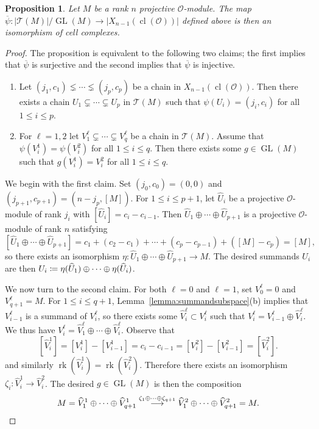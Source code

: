 \documentclass[11 pt]{article}
\theoremstyle{plain}
\newtheorem{proposition}[theorem]{Proposition}
\theoremstyle{definition}
\numberwithin{equation}{section}
\DeclareMathOperator{\GL}{GL}
\renewcommand{\O}{\mathcal{O}}
\DeclareMathOperator{\class}{cl}
\newcommand\Tits{\ensuremath{\mathcal{T}}}
\newcommand\coloneq{\mathrel{\mathop:}\mkern-1.2mu=}
\newcommand\abs[1]{\left\lvert#1\right\rvert}
\DeclareMathOperator{\Rank}{rk}
\begin{document}
\begin{proposition}
\label{proposition:quotientdesc}
Let $M$ be a rank $n$ projective $\O$-module.
The map $\overline{\psi}\colon \abs{\Tits(M)} / \GL(M) \rightarrow \abs{X_{n-1}(\class(\O))}$ defined
above is then an isomorphism of cell complexes.
\end{proposition}
\begin{proof}
The proposition is equivalent to the following two claims; the first implies that $\overline{\psi}$ is surjective
and the second implies that $\overline{\psi}$ is injective.
\begin{enumerate}[nosep]
\item Let $(j_1,c_1) \lneq \cdots \lneq (j_p,c_{p})$ be a chain in $X_{n-1}(\class(\O))$.  Then
there exists a chain $U_1 \subsetneq \cdots \subsetneq U_p$ in $\Tits(M)$ such that
$\psi(U_i) = (j_i,c_i)$ for all $1 \leq i \leq p$.
\item For $\ell=1,2$ let $V_1^{\ell} \subsetneq \cdots \subsetneq V_q^{\ell}$ be a chain in $\Tits(M)$.  Assume
that $\psi(V_i^{1}) = \psi(V_i^2)$ for all $1 \leq i \leq q$.  Then there exists some $g \in \GL(M)$
such that $g(V_i^1) = V_i^2$ for all $1 \leq i \leq q$.
\end{enumerate}
We begin with the first claim.  Set 
$(j_0,c_0) = (0,0)$ and $(j_{p+1},c_{p+1}) = (n-j_p,[M])$.
For $1 \leq i \leq p+1$, let $\widehat{U}_i$ be a projective $\O$-module
of rank $j_i$ with $[\widehat{U}_i] = c_i - c_{i-1}$.
Then $\widehat{U}_1 \oplus \cdots \oplus \widehat{U}_{p+1}$ is a projective $\O$-module of rank $n$ satisfying
\[[\widehat{U}_1 \oplus \cdots \oplus \widehat{U}_{p+1}] = c_1 + (c_2 - c_1) + \cdots + (c_p - c_{p-1}) + ([M] - c_p) = [M],\]
so there exists an isomorphism $\eta\colon \widehat{U}_1 \oplus \cdots \oplus \widehat{U}_{p+1} \rightarrow M$.
The desired summands $U_i$ are then
$U_i\coloneq  \eta(\widehat{U}_1) \oplus \cdots \oplus \eta(\widehat{U}_i)$.

We now turn to the second claim.  For both $\ell=0$ and $\ell=1$, set $V_0^{\ell} = 0$ and $V_{q+1}^{\ell} = M$.
For $1 \leq i \leq q+1$, Lemma~\ref{lemma:summandsubspace}(b) implies that $V_{i-1}^{\ell}$ is a summand
of $V_i^{\ell}$, so there exists some $\widehat{V}_i^{\ell} \subset V_i^{\ell}$ such that
$V_i^{\ell} = V_{i-1}^{\ell} \oplus \widehat{V}_i^{\ell}$.  We thus have
$V_i^{\ell} = \widehat{V}_1^{\ell} \oplus \cdots \oplus \widehat{V}_i^{\ell}$.  Observe that
\[[\widehat{V}_i^{1}] = [V_i^{1}] - [V_{i-1}^{1}] = c_i - c_{i-1} = [V_i^2] - [V_{i-1}^2] = [\widehat{V}_i^{2}].\]
and similarly $\Rank(\widehat{V}_i^1)=\Rank(\widehat{V}_i^2)$.  Therefore there exists an isomorphism $\zeta_i\colon \widehat{V}_i^{1} \rightarrow \widehat{V}_i^{2}$.
The desired $g \in \GL(M)$ is then the composition
\[M = \widehat{V}_1^{1} \oplus \cdots \oplus \widehat{V}_{q+1}^1 \stackrel{\zeta_1 \oplus \cdots \oplus \zeta_{q+1}}{\longrightarrow} \widehat{V}_1^{2} \oplus \cdots \oplus \widehat{V}_{q+1}^2 = M. \qedhere\]
\end{proof}
\end{document}
